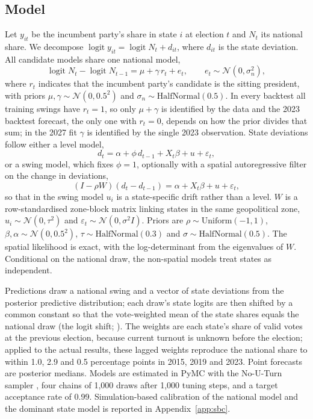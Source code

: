 \documentclass[preprint,12pt,authoryear]{elsarticle}
\begin{document}
\subsection{Model}
Let $y_{it}$ be the incumbent party's share in state $i$ at election $t$ and $N_t$ its national share. We decompose $\operatorname{logit} y_{it} = \operatorname{logit} N_t + d_{it}$, where $d_{it}$ is the state deviation. All candidate models share one national model,
\begin{equation}
\operatorname{logit} N_t - \operatorname{logit} N_{t-1} = \mu + \gamma\, r_t + e_t, \qquad e_t \sim \mathcal{N}(0, \sigma_n^2),
\end{equation}
where $r_t$ indicates that the incumbent party's candidate is the sitting president, with priors $\mu, \gamma \sim \mathcal{N}(0, 0.5^2)$ and $\sigma_n \sim \text{HalfNormal}(0.5)$. In every backtest all training swings have $r_t = 1$, so only $\mu + \gamma$ is identified by the data and the 2023 backtest forecast, the only one with $r_t = 0$, depends on how the prior divides that sum; in the 2027 fit $\gamma$ is identified by the single 2023 observation. State deviations follow either a level model,
\begin{equation}
d_t = \alpha + \phi\, d_{t-1} + X_t \beta + u + \varepsilon_t,
\end{equation}
or a swing model, which fixes $\phi = 1$, optionally with a spatial autoregressive filter on the change in deviations,
\begin{equation}
(I - \rho W)(d_t - d_{t-1}) = \alpha + X_t \beta + u + \varepsilon_t ,
\end{equation}
so that in the swing model $u_i$ is a state-specific drift rather than a level. $W$ is a row-standardised zone-block matrix linking states in the same geopolitical zone, $u_i \sim \mathcal{N}(0, \tau^2)$ and $\varepsilon_t \sim \mathcal{N}(0, \sigma^2 I)$. Priors are $\rho \sim \text{Uniform}(-1,1)$, $\beta, \alpha \sim \mathcal{N}(0, 0.5^2)$, $\tau \sim \text{HalfNormal}(0.3)$ and $\sigma \sim \text{HalfNormal}(0.5)$. The spatial likelihood is exact, with the log-determinant from the eigenvalues of $W$. Conditional on the national draw, the non-spatial models treat states as independent.

Predictions draw a national swing and a vector of state deviations from the posterior predictive distribution; each draw's state logits are then shifted by a common constant so that the vote-weighted mean of the state shares equals the national draw (the logit shift; \citealp{Rosenman2021RecalibrationPredictive}). The weights are each state's share of valid votes at the previous election, because current turnout is unknown before the election; applied to the actual results, these lagged weights reproduce the national share to within 1.0, 2.9 and 0.5 percentage points in 2015, 2019 and 2023. Point forecasts are posterior medians. Models are estimated in PyMC \citep{AbrilPla2023PyMC} with the No-U-Turn sampler \citep{Hoffman2011NouturnSampler}, four chains of 1,000 draws after 1,000 tuning steps, and a target acceptance rate of 0.99. Simulation-based calibration of the national model and the dominant state model is reported in Appendix~\ref{app:sbc}.
\end{document}
